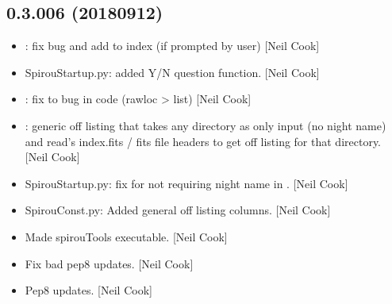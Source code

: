 \documentclass[a4paper,10pt,english]{report}
\begin{document}
\subsection{0.3.006 (2018\sphinxhyphen{}09\sphinxhyphen{}12)}
\label{\detokenize{misc/changelog:id347}}\begin{itemize}
\item {} 
: fix bug and add to index (if prompted by user) {[}Neil
Cook{]}

\item {} 
SpirouStartup.py: added Y/N question function. {[}Neil Cook{]}

\item {} 
: fix to bug in code (rawloc \textendash{}\textgreater{} list) {[}Neil Cook{]}

\item {} 
: generic off listing that takes any directory as only
input (no night name) and read’s index.fits /  fits file headers to
get off listing for that directory. {[}Neil Cook{]}

\item {} 
SpirouStartup.py: fix for not requiring night name in .
{[}Neil Cook{]}

\item {} 
SpirouConst.py: Added general off listing columns. {[}Neil Cook{]}

\item {} 
Made spirouTools executable. {[}Neil Cook{]}

\item {} 
Fix bad pep8 updates. {[}Neil Cook{]}

\item {} 
Pep8 updates. {[}Neil Cook{]}

\end{itemize}
\end{document}
